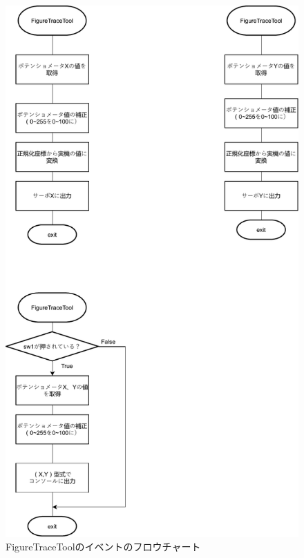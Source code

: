 \documentclass{jarticle}
\begin{document}
\begin{figure}[H]
    \centering
    \includegraphics[scale=0.9]{kumikomiKadai8-event.pdf}
    \caption{FigureTraceToolのイベントのフロウチャート}
    \label{fig:my_label}
\end{figure}
\end{document}
